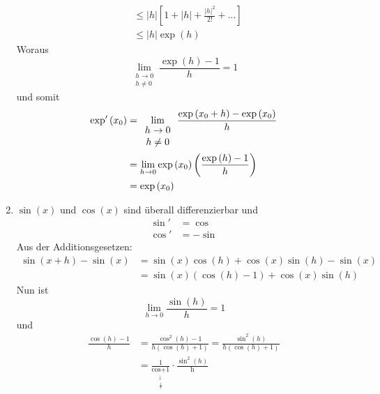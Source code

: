 \begin{enumerate}
\begin{align*}
&\le \left| h \right|\left[ {1 + \left| h \right| + \frac{{{{\left| h \right|}^2}}}{{2!}} +  \ldots } \right]\\
&\le \left| h \right|\exp \left( h \right)
\end{align*}
Woraus 
\[\mathop {\lim }\limits_{\begin{array}{*{20}{c}}
{h \to 0}\\
{h\not  = 0}
\end{array}} \frac{{\exp \left( h \right) - 1}}{h} = 1\]
und somit 
\begin{align*}
{\mathop{\rm exp'}\nolimits} \left( {{x_0}} \right)&= \mathop {\lim }\limits_{\begin{array}{*{20}{c}}
{h \to 0}\\
{h\not  = 0}
\end{array}} \frac{{\exp \left( {{x_0} + h} \right) - \exp \left( {{x_0}} \right)}}{h}\\
&= \mathop {\lim }\limits_{h \to 0} \exp \left( {{x_0}} \right)\left( {\frac{{\exp \left( h \right) - 1}}{h}} \right)\\
&= \exp \left( {{x_0}} \right)
\end{align*}
\item $\sin(x)$ und $\cos(x)$ sind überall differenzierbar und 
\begin{align*}
\sin'&=\cos\\
\cos'&=-\sin
\end{align*}
Aus der Additionsgesetzen:
\begin{align*}
\sin \left( {x + h} \right) - \sin \left( x \right) &= \sin \left( x \right)\cos \left( h \right) + \cos \left( x \right)\sin \left( h \right) - \sin \left( x \right)\\
& = \sin \left( x \right)\left( {\cos \left( h \right) - 1} \right) + \cos \left( x \right)\sin \left( h \right)
\end{align*}
Nun ist 
\[\mathop {\lim }\limits_{h \to 0} \frac{{\sin \left( h \right)}}{h} = 1\]
und 
\begin{align*}
\frac{{\cos \left( h \right) - 1}}{h} &= \frac{{{{\cos }^2}\left( h \right) - 1}}{{h\left( {\cos \left( h \right) + 1} \right)}} = \frac{{{{\sin }^2}\left( h \right)}}{{h\left( {\cos \left( h \right) + 1} \right)}}\\
& = \frac{1}{{\mathop {\cos \left( h \right) + 1}\limits_{\begin{array}{*{20}{c}}
 \downarrow \\
{\frac{1}{2}}
\end{array}} }} \cdot \frac{{{{\sin }^2}\left( h \right)}}{{\mathop h\limits_{\begin{array}{*{20}{c}}

\end{array}}}}
\end{align*}
\end{enumerate}
